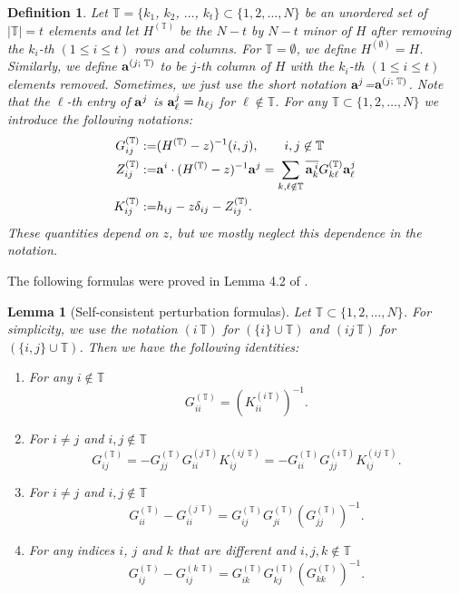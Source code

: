 \documentclass[draft]{article}
\newcommand{\non}{\nonumber}
\newcommand{\wH}{{K}}
\newcommand{\ba}{{\bf{a}}}
\newcommand{\bT}{{\T}}
\newcommand{\be}{\begin{equation}}
\newcommand{\ee}{\end{equation}}
\newcommand{\T}{\mathbb T}
\newtheorem{lemma}[theorem]{Lemma}
\newtheorem{definition}{Definition}
\numberwithin{equation}{section}
\numberwithin{theorem}{section}
\numberwithin{definition}{section}
\numberwithin{remark}{section}
\begin{document}
\begin{definition}\label{basicd}
 Let ${\T}=\{k_1$, $k_2$, $\ldots$, $k_t\}\subset \{1,2, \ldots ,N\}$
 be  an unordered set of $|\bT|=t$ elements and let 
 $H^{(\bT)}$ be the $N-t$ by $N-t$ minor of $H$ after removing the
 $k_i$-th $(1\leq i\leq t)$ rows and columns. For $\bT=\emptyset$, we define $H^{(\emptyset)}=H$.
Similarly, we define $\ba^{(j;\,\,{\T})}$ to be
 $j$-th column of $H$ with the $k_i$-th $(1\leq i\leq t)$
 elements removed. Sometimes, we just use the short notation 
$\ba^{j}$=$\ba^{(j;\,\,{\T})}$. Note that the $\ell$-th entry of $\ba^j$ is
 $\ba^j_\ell= h_{\ell j}$ for $\ell\not\in \T$.
 For any ${\T}\subset \{ 1, 2, \ldots , N\}$ we introduce the following notations:
 \begin{align}
 G^{({\T})}_{ij}:=&(H^{({\T})}-z)^{-1}(i,j) ,\qquad i,j\not\in\T\non\\
 Z^{({\T})}_{ij}:=&\ba^{i}\cdot(H^{({\T})}-z)^{-1}\ba^{j}=\sum_{k,\ell\notin {\T}}
\overline{\ba^{\,i}_k} G^{({\T})}_{k \ell}\ba^{j}_{\ell\,} \non \\
\wH^{({\T})}_{ij}:= & h_{ij}-z\delta_{ij}-Z^{({\T})}_{ij}. 
 \end{align}
These quantities depend on $z$, but we mostly neglect this dependence in the notation. 
\end{definition}
\bigskip

The following  formulas  were proved in
  Lemma 4.2  of \cite{EYY}. 

\begin{lemma}[Self-consistent perturbation formulas] \label{basicIG} Let 
$\bT\subset \{ 1, 2, \ldots, N\}$. For  simplicity, we use the
 notation $(i \,{\T})$ for $(\{i\}\cup {\T})$ and $(i j \,{\T})$
 for $(\{i,j\}\cup {\T})$. 
 Then we have the following identities:
\par\begin{enumerate}    
\item For any  $i\notin {\T}$ 
\be\label{GiiHii} 
 G^{({\T})}_{ii}=(\wH^{(i\,{\T})}_{ii})^{-1}.
 \ee
 \item For $i\neq j$ and $i,j\notin {\T}$
\be\label{GijHij} 
 G^{({\T})}_{ij}=-G^{({\T})}_{jj}G_{ii}^{(j\,{\T})}\wH^{(ij\,\,{\T})}_{ij}=
-G^{({\T})}_{ii}G_{jj}^{(i\,{\T})}\wH^{(ij\,\,{\T})}_{ij}.
 \ee
 	\item  For $i\neq j$ and $i,j\notin {\T}$
  \be\label{GiiGjii}
  G^{({\T})}_{ii}-G^{(j\,\,{\T})}_{ii}=
G^{({\T})}_{ij}G^{({\T})}_{ji}(G^{({\T})}_{jj})^{-1}.
  \ee
  \item  For any indices  $i$, $j$ and $k$ that are different  and 
  $i,j,k \notin {\T}$
 \be\label{GijGkij}
G^{({\T})}_{ij}-G^{(k\,\,{\T})}_{ij}=G^{({\T})}_{ik}G^{({\T})}_{kj}
(G^{({\T})}_{kk})^{-1} . \ee 
 \end{enumerate}
 
\end{lemma}
\end{document}
